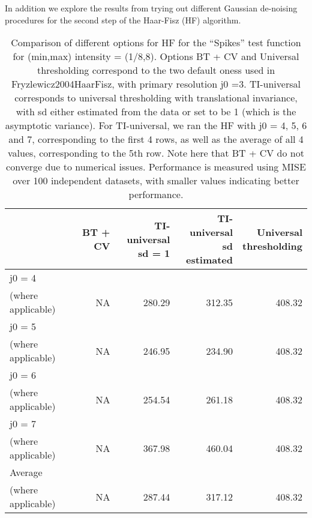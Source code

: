 \documentclass[12pt]{article}
\begin{document}
In addition we explore the results from trying out different Gaussian de-noising procedures for the second step of the Haar-Fisz (HF) algorithm.

\begin{table}[ht]
\centering
\begin{tabular}{lrrrr}
  \hline
 & BT + CV & \pbox{20cm}{TI-universal \\ sd = 1} & \pbox{20cm}{TI-universal \\ sd estimated} & \pbox{20cm}{Universal \\ thresholding} \\ 
  \hline
j0 = 4 \\
 (where applicable) & NA & 280.29 & 312.35 & 408.32 \\ 
  j0 = 5 \\
 (where applicable) & NA & 246.95 & 234.90 & 408.32 \\ 
  j0 = 6 \\
 (where applicable) & NA & 254.54 & 261.18 & 408.32 \\ 
  j0 = 7 \\
 (where applicable) & NA & 367.98 & 460.04 & 408.32 \\ 
  Average \\
 (where applicable) & NA & 287.44 & 317.12 & 408.32 \\ 
   \hline
\end{tabular}
\caption{Comparison of different options for HF for the ``Spikes'' test function for (min,max) intensity = (1/8,8). Options BT + CV and Universal thresholding correspond to the two default oness used in {Fryzlewicz2004HaarFisz}, with primary resolution j0 =3. TI-universal corresponds to universal thresholding with translational invariance, with sd either estimated from the data or set to be 1 (which is the asymptotic variance). For TI-universal, we ran the HF with j0 = 4, 5, 6 and 7, corresponding to the first 4 rows, as well as the average of all 4 values, corresponding to the 5th row. Note here that BT + CV do not converge due to numerical issues. Performance is measured using MISE over 100 independent datasets, with smaller values indicating better performance.} 
\label{table:pois_hf_sp_8}
\end{table}
\end{document}
